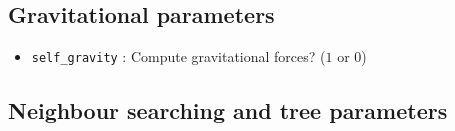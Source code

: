 \documentclass[a4paper]{article}
\newcommand{\var}[1]{\texttt{#1}}
\begin{document}
\subsection{Gravitational parameters}

\begin{itemize}

\item \var{self\_gravity} : Compute gravitational forces?   ($1$ or $0$)







\end{itemize}



\subsection{Neighbour searching and tree parameters}
\end{document}
